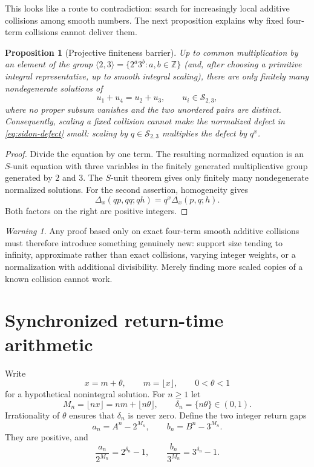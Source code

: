 \documentclass[11pt]{article}
\newtheorem{proposition}[theorem]{Proposition}
\theoremstyle{definition}
\theoremstyle{remark}
\newtheorem{warning}[theorem]{Warning}
\newcommand{\Ssmooth}{\mathcal S_{2,3}}
\newcommand{\ZZ}{\mathbb Z}
\begin{document}
This looks like a route to contradiction: search for increasingly local additive collisions among smooth numbers. The next proposition explains why fixed four-term collisions cannot deliver them.

\begin{proposition}[Projective finiteness barrier]\label{prop:sunit-finite}
Up to common multiplication by an element of the group $\langle2,3\rangle=\{2^a3^b:a,b\in\ZZ\}$ (and, after choosing a primitive integral representative, up to smooth integral scaling), there are only finitely many nondegenerate solutions of
\[
 u_1+u_4=u_2+u_3,
 \qquad u_i\in\Ssmooth,
\]
where no proper subsum vanishes and the two unordered pairs are distinct. Consequently, scaling a fixed collision cannot make the normalized defect in \eqref{eq:sidon-defect} small: scaling by $q\in\Ssmooth$ multiplies the defect by $q^x$.
\end{proposition}

\begin{proof}
Divide the equation by one term. The resulting normalized equation is an $S$-unit equation with three variables in the finitely generated multiplicative group generated by $2$ and $3$. The $S$-unit theorem gives only finitely many nondegenerate normalized solutions. For the second assertion, homogeneity gives
\[
 \Delta_x(qp,qq;qh)=q^x\Delta_x(p,q;h).
\]
Both factors on the right are positive integers.
\end{proof}

\begin{warning}
Any proof based only on exact four-term smooth additive collisions must therefore introduce something genuinely new: support size tending to infinity, approximate rather than exact collisions, varying integer weights, or a normalization with additional divisibility. Merely finding more scaled copies of a known collision cannot work.
\end{warning}

\section{Synchronized return-time arithmetic}\label{sec:return}

Write
\[
 x=m+\theta,\qquad m=\lfloor x\rfloor,\qquad 0<\theta<1
\]
for a hypothetical nonintegral solution. For $n\ge1$ let
\[
 M_n=\lfloor nx\rfloor=nm+\lfloor n\theta\rfloor,
 \qquad \delta_n=\{n\theta\}\in(0,1).
\]
Irrationality of $\theta$ ensures that $\delta_n$ is never zero. Define the two integer return gaps
\begin{equation}\label{eq:return-gaps}
 a_n=A^n-2^{M_n},\qquad b_n=B^n-3^{M_n}.
\end{equation}
They are positive, and
\begin{equation}\label{eq:return-normalized}
 \frac{a_n}{2^{M_n}}=2^{\delta_n}-1,
 \qquad
 \frac{b_n}{3^{M_n}}=3^{\delta_n}-1.
\end{equation}
\end{document}
